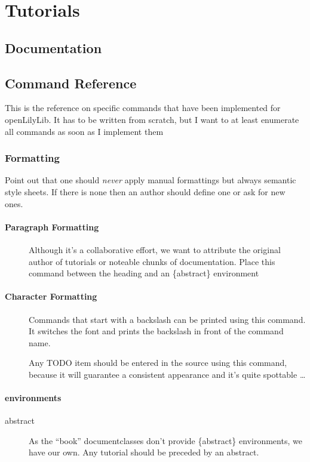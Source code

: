\documentclass[openLilyLib_CG]{subfiles}
\begin{document}
\part{Tutorials}

\chapter{Documentation}

\chapter{Command Reference}

This is the reference on specific commands that have been implemented for openLilyLib.
It has to be written from scratch, but I want to at least enumerate all commands as soon as I implement them

\section{Formatting}
Point out that one should \emph{never} apply manual formattings but always semantic style sheets.
If there is none then an author should define one or ask for new ones.

\subsection{Paragraph Formatting}
\begin{description}
\item[] Although it's a collaborative effort, we want to attribute the original author of tutorials or noteable chunks of documentation. Place this command between the  heading and an \{abstract\} environment
\end{description}

\subsection{Character Formatting}

\begin{description}
\item[] Commands that start with a backslash can be printed using this command. It switches the font and prints the backslash in front of the command name.
\item[] Any TODO item should be entered in the source using this command, because it will guarantee a consistent appearance and it's quite spottable \dots
\end{description}

\subsection{environments}
\begin{description}
\item[abstract] As the “book” documentclasses don't provide \{abstract\} environments, we have our own. Any tutorial should be preceded by an abstract.
\end{description}
\end{document}
